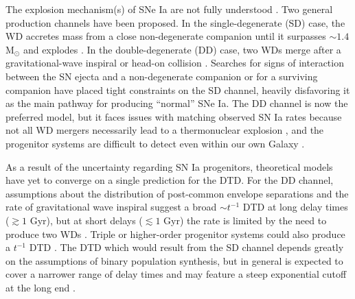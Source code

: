 \documentclass[twocolumn,twocolappendix,linenumbers]{aastex631}
\begin{document}
The explosion mechanism(s) of SNe Ia are not fully understood \citep[for reviews, see][]{Maoz2014-Review,Livio2018-ProgenitorReview,Ruiter2020-ProgenitorReview}. Two general production channels have been proposed. In the single-degenerate (SD) case, the WD accretes mass from a close non-degenerate companion until it surpasses $\sim1.4$ M$_\odot$ and explodes \citep{Whelan1973-SDModel,Nomoto1982-SDModel,Yoon2003-SDModel}. In the double-degenerate (DD) case, two WDs merge after a gravitational-wave inspiral \citep{Iben1984-IaBinary,Webbink1984-DDModel,Pakmor2012-WDMerger} or head-on collision \citep{Benz1989-CollisionalDD,Thompson2011-CollisionalDD}. Searches for signs of interaction between the SN ejecta and a non-degenerate companion \citep[e.g.,][]{Panagia2006-RadioEmission,Chomiuk2016-RadioEmission,Fausnaugh2019-EarlyIaLightCurves,Tucker2020-SNeIaSpectra,Dubay2022-SNeIaCSM} or for a surviving companion \citep[e.g.,][]{Schaefer2012-ExCompanionSNR,Do2021-Progenitor1972E,Tucker2023-SN2011fe} have placed tight constraints on the SD channel, heavily disfavoring it as the main pathway for producing ``normal'' SNe Ia. The DD channel is now the preferred model, but it faces issues with matching observed SN Ia rates because not all WD mergers necessarily lead to a thermonuclear explosion \citep[e.g.,][]{NomotoIben1985-DDMergers,SaioNomoto1998-DDMergers,Shen2012-DDMergers}, and the progenitor systems are difficult to detect even within our own Galaxy \citep{RebassaMansergas2019-WhereAreDDProgenitors}.

As a result of the uncertainty regarding SN Ia progenitors, theoretical models have yet to converge on a single prediction for the DTD. For the DD channel, assumptions about the distribution of post-common envelope separations and the rate of gravitational wave inspiral suggest a broad $\sim t^{-1}$ DTD at long delay times ($\gtrsim 1$ Gyr), but at short delays ($\lesssim 1$ Gyr) the rate is limited by the need to produce two WDs \citep[see][]{Maoz2014-Review}. Triple or higher-order progenitor systems could also produce a $t^{-1}$ DTD \citep{Fang2018-QuadrupleSystems,Rajamuthukumar2023-TripleEvolution}. The DTD which would result from the SD channel depends greatly on the assumptions of binary population synthesis, but in general is expected to cover a narrower range of delay times and may feature a steep exponential cutoff at the long end \citep[e.g.,][]{Greggio2005-AnalyticalRates}.
\end{document}
